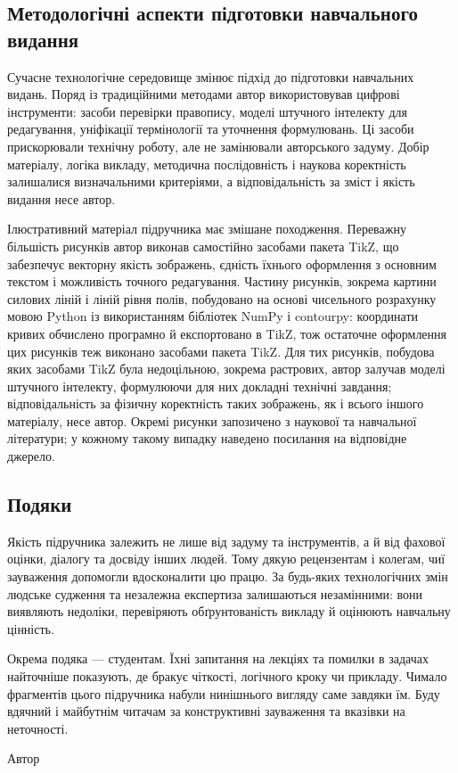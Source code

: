 \subsection*{Методологічні аспекти підготовки навчального видання}

Сучасне технологічне середовище змінює підхід до підготовки навчальних видань. Поряд із
традиційними методами автор використовував цифрові інструменти: засоби перевірки
правопису, моделі штучного інтелекту для редагування, уніфікації термінології та уточнення
формулювань. Ці засоби прискорювали технічну роботу, але не замінювали авторського задуму.
Добір матеріалу, логіка викладу, методична послідовність і наукова коректність залишалися
визначальними критеріями, а відповідальність за зміст і якість видання несе автор.

Ілюстративний матеріал підручника має змішане походження. Переважну більшість рисунків
автор виконав самостійно засобами пакета TikZ, що забезпечує векторну якість зображень,
єдність їхнього оформлення з основним текстом і можливість точного редагування. Частину рисунків, зокрема картини силових ліній і ліній
рівня полів, побудовано на основі чисельного розрахунку мовою Python із використанням
бібліотек NumPy і contourpy: координати кривих обчислено програмно й експортовано в TikZ,
тож остаточне оформлення цих рисунків теж виконано засобами пакета TikZ. Для тих
рисунків, побудова яких засобами TikZ була недоцільною, зокрема растрових, автор залучав
моделі штучного інтелекту, формулюючи для них докладні технічні завдання; відповідальність
за фізичну коректність таких зображень, як і всього іншого матеріалу, несе автор. Окремі
рисунки запозичено з наукової та навчальної літератури; у кожному такому випадку наведено
посилання на відповідне джерело.

\subsection*{Подяки}

Якість підручника залежить не лише від задуму та інструментів, а й від фахової оцінки,
діалогу та досвіду інших людей. Тому дякую рецензентам і колегам, чиї зауваження допомогли
вдосконалити цю працю. За будь-яких технологічних змін людське судження та незалежна
експертиза залишаються незамінними: вони виявляють недоліки, перевіряють обґрунтованість
викладу й оцінюють навчальну цінність.

Окрема подяка --- студентам. Їхні запитання на лекціях та помилки в задачах найточніше
показують, де бракує чіткості, логічного кроку чи прикладу. Чимало фрагментів цього
підручника набули нинішнього вигляду саме завдяки їм. Буду вдячний і майбутнім читачам за
конструктивні зауваження та вказівки на неточності.

\vspace*{2em}

\begin{flushright}
   Автор
\end{flushright}